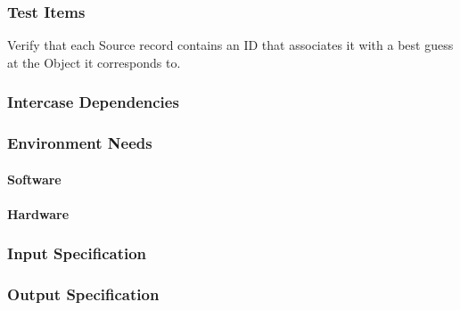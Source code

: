 \subsubsection{Test Items}
Verify that each Source record contains an ID that associates it with a
best guess at the Object it corresponds to.



\subsubsection{Intercase Dependencies}

\subsubsection{Environment Needs}

\paragraph{Software}

\paragraph{Hardware}

\subsubsection{Input Specification}

\subsubsection{Output Specification}

